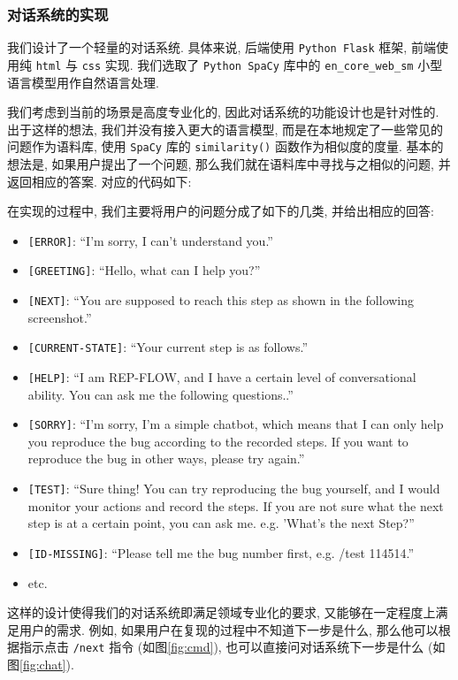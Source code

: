 \subsubsection{对话系统的实现}
我们设计了一个轻量的对话系统. 具体来说, 后端使用 \lstinline{Python Flask} 框架, 前端使用纯 \lstinline{html} 与 \lstinline{css} 实现. 我们选取了 \lstinline{Python SpaCy} 库中的 \lstinline{en_core_web_sm} 小型语言模型用作自然语言处理. 

我们考虑到当前的场景是高度专业化的, 因此对话系统的功能设计也是针对性的. 出于这样的想法, 我们并没有接入更大的语言模型, 而是在本地规定了一些常见的问题作为语料库, 使用 \lstinline{SpaCy} 库的 \lstinline{similarity()} 函数作为相似度的度量. 基本的想法是, 如果用户提出了一个问题, 那么我们就在语料库中寻找与之相似的问题, 并返回相应的答案. 对应的代码如下:
\scalebox{0.96}{
    
}

在实现的过程中, 我们主要将用户的问题分成了如下的几类, 并给出相应的回答:
\begin{itemize}
    \item \lstinline{[ERROR]}: ``I'm sorry, I can't understand you.''
    \item \lstinline{[GREETING]}: ``Hello, what can I help you?''
    \item \lstinline{[NEXT]}: ``You are supposed to reach this step as shown in the following screenshot.''
    \item \lstinline{[CURRENT-STATE]}: ``Your current step is as follows.''
    \item \lstinline{[HELP]}: ``I am REP-FLOW, and I have a certain level of conversational ability. You can ask me the following questions..''
    \item \lstinline{[SORRY]}: ``I'm sorry, I'm a simple chatbot, which means that I can only help you reproduce the bug according to the recorded steps. If you want to reproduce the bug in other ways, please try again.''
    \item \lstinline{[TEST]}: ``Sure thing! You can try reproducing the bug yourself, and I would monitor your actions and record the steps. If you are not sure what the next step is at a certain point, you can ask me. e.g. 'What's the next Step?''
    \item \lstinline{[ID-MISSING]}: ``Please tell me the bug number first, e.g. /test 114514.''
    \item etc.
\end{itemize}

这样的设计使得我们的对话系统即满足领域专业化的要求, 又能够在一定程度上满足用户的需求. 例如, 如果用户在复现的过程中不知道下一步是什么, 那么他可以根据指示点击 \lstinline{/next} 指令 (如图\ref{fig:cmd}), 也可以直接问对话系统下一步是什么 (如图\ref{fig:chat}).

